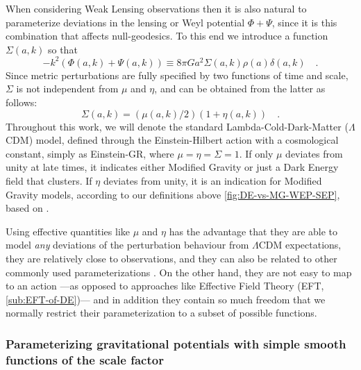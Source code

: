 When considering Weak Lensing observations then it is also natural
to parameterize deviations in the lensing or Weyl potential $\Phi+\Psi$,
since it is this combination that affects null-geodesics.
To this end we introduce a function $\Sigma(a,k)$ so that
\begin{equation}\label{eq:Sigma-def}
-k^{2}(\Phi(a,k)+\Psi(a,k))\equiv8\pi
Ga^{2}\Sigma(a,k)\rho(a)\delta(a,k) \quad .
\end{equation}
Since metric perturbations are fully specified by two functions of
time and scale, $\Sigma$ is not independent from $\mu$ and $\eta$,
and can be obtained from the latter as follows: 
\begin{equation}\label{eq:SigmaofMuEta}
\Sigma(a,k)=(\mu(a,k)/2)(1+\eta(a,k)) \quad.
\end{equation}
Throughout this work, we will denote the standard Lambda-Cold-Dark-Matter ($\Lambda$CDM) model,
defined through the Einstein-Hilbert action with a cosmological constant, simply as Einstein-GR, where $\mu=\eta=\Sigma=1$. 
If only $\mu$ deviates from unity at late times,
it indicates either Modified Gravity or just a Dark Energy field that clusters.
If $\eta$ deviates from unity, it is an indication for Modified Gravity models, according to our definitions above \cref{fig:DE-vs-MG-WEP-SEP}, based on \cite{joyce_dark_2016}.


Using effective quantities like $\mu$ and $\eta$ has the advantage
that they are able to model {\em any} deviations of the perturbation
behaviour from $\Lambda$CDM expectations, they are relatively close 
to observations, and they can also be related to other commonly used 
parameterizations \cite{pogosian_how_2010}.
On the other hand, they are not
easy to map to an action ---as opposed to approaches like Effective
Field Theory (EFT, \cref{sub:EFT-of-DE})---  and in addition they
contain so much freedom that we normally restrict their parameterization
to a subset of possible functions.


\subsubsection{Parameterizing gravitational potentials with simple smooth functions of the scale factor \label{sub:param-smooth-funct}}


